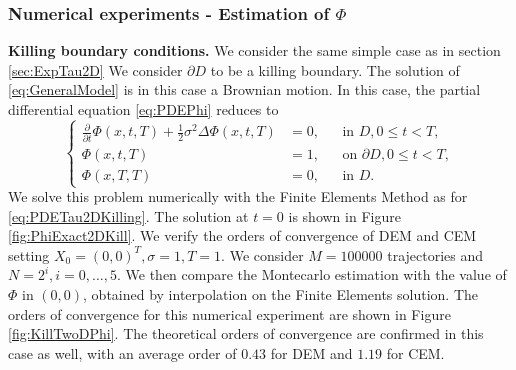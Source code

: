 \subsubsection{Numerical experiments - Estimation of $\Phi$}

\textbf{Killing boundary conditions.} We consider the same simple case as in section \ref{sec:ExpTau2D} We consider $\partial D$ to be a killing boundary. The solution of \eqref{eq:GeneralModel} is in this case a Brownian motion. In this case, the partial differential equation \eqref{eq:PDEPhi} reduces to
\begin{equation}\label{eq:PDEPhi2DKilling}
	\left \{
  	\begin{aligned}
	\frac{\partial}{\partial t} \Phi(x,t,T) + \frac{1}{2} \sigma^2 \Delta \Phi(x,t,T) &= 0, && \text{in } D, 0 \leq t < T,\\
	\Phi(x,t,T) &= 1, && \text{on } \partial D, 0 \leq t < T,\\
	\Phi(x,T,T) &= 0, && \text{in } D.
  	\end{aligned} \right.
\end{equation}
We solve this problem numerically with the Finite Elements Method as for \eqref{eq:PDETau2DKilling}. The solution at $t = 0$ is shown in Figure \ref{fig:PhiExact2DKill}. We verify the orders of convergence of DEM and CEM setting $X_0 = (0,0)^T , \sigma = 1, T = 1$. We consider $M = 100000$ trajectories and $N = 2^i,i=0,\dots,5$. We then compare the Montecarlo estimation with the value of $\Phi$ in $(0,0)$, obtained by interpolation on the Finite Elements solution. The orders of convergence for this numerical experiment are shown in Figure \ref{fig:KillTwoDPhi}. The theoretical orders of convergence are confirmed in this case as well, with an average order of $0.43$ for DEM and $1.19$ for CEM.

